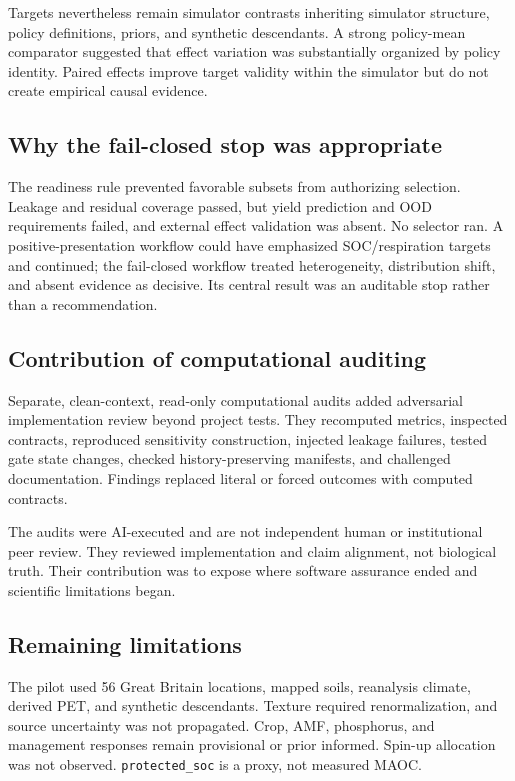\documentclass[11pt]{article}
\newcommand{\protectedSOC}{\texttt{protected\_soc}}
\begin{document}
Targets nevertheless remain simulator contrasts inheriting simulator structure, policy definitions, priors, and synthetic descendants. A strong policy-mean comparator suggested that effect variation was substantially organized by policy identity. Paired effects improve target validity within the simulator but do not create empirical causal evidence.

\subsection{Why the fail-closed stop was appropriate}

The readiness rule prevented favorable subsets from authorizing selection. Leakage and residual coverage passed, but yield prediction and OOD requirements failed, and external effect validation was absent. No selector ran. A positive-presentation workflow could have emphasized SOC/respiration targets and continued; the fail-closed workflow treated heterogeneity, distribution shift, and absent evidence as decisive. Its central result was an auditable stop rather than a recommendation.

\subsection{Contribution of computational auditing}

Separate, clean-context, read-only computational audits added adversarial implementation review beyond project tests. They recomputed metrics, inspected contracts, reproduced sensitivity construction, injected leakage failures, tested gate state changes, checked history-preserving manifests, and challenged documentation. Findings replaced literal or forced outcomes with computed contracts.

The audits were AI-executed and are not independent human or institutional peer review. They reviewed implementation and claim alignment, not biological truth. Their contribution was to expose where software assurance ended and scientific limitations began.

\subsection{Remaining limitations}

The pilot used 56 Great Britain locations, mapped soils, reanalysis climate, derived PET, and synthetic descendants. Texture required renormalization, and source uncertainty was not propagated. Crop, AMF, phosphorus, and management responses remain provisional or prior informed. Spin-up allocation was not observed. \protectedSOC{} is a proxy, not measured MAOC.
\end{document}
